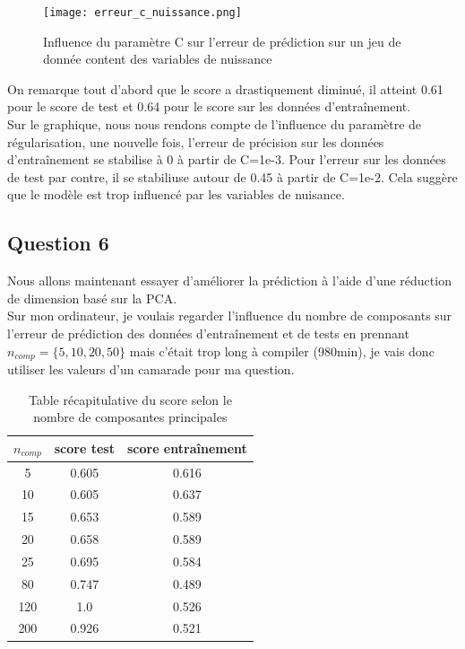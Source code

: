 \documentclass{article}
\begin{document}
\begin{figure}[H]
    \centering
    \texttt{[image: erreur\_c\_nuissance.png]}
    \caption{Influence du paramètre C sur l'erreur de prédiction sur un jeu de donnée content des variables de nuissance}
    \label{fig5}
\end{figure}

On remarque tout d'abord que le score a drastiquement diminué, il atteint 0.61 pour le score de test et 0.64 pour le score sur les données d'entraînement.\\
Sur le graphique, nous nous rendons compte de l'influence du paramètre de régularisation, une nouvelle fois, l'erreur de précision sur les données d'entraînement se stabilise à 0 à partir de C=1e-3. Pour l'erreur sur les données de test par contre, il se stabiliuse autour de 0.45 à partir de C=1e-2. Cela suggère que le modèle est trop influencé par les variables de nuisance.

\subsection{Question 6}
Nous allons maintenant essayer d'améliorer la prédiction à l'aide d'une réduction de dimension basé sur la PCA.\\

Sur mon ordinateur, je voulais regarder l'influence du nombre de composants sur l'erreur de prédiction des données d'entraînement et de tests en prennant $n_{comp}=\{5,10,20,50\}$ mais c'était trop long à compiler (980min), je vais donc utiliser les valeurs d'un camarade pour ma question.\\


\begin{table}[H]
    \centering
    \begin{tabular}{|c|c|c|}
    \hline
       $n_{comp}$  & score test & score entraînement \\
    \hline
       5  & 0.605 & 0.616  \\
    \hline     
      10   & 0.605  &  0.637 \\
    \hline     
       15  & 0.653 & 0.589  \\
    \hline     
      20   & 0.658 &   0.589 \\
    \hline
       25  & 0.695 &  0.584 \\
    \hline
       80  & 0.747 & 0.489  \\
    \hline
      120  & 1.0 &  0.526 \\
    \hline
      200  & 0.926 &  0.521 \\
    \hline
    \end{tabular}
    \caption{Table récapitulative du score selon le nombre de composantes principales}
    \label{tab1}
\end{table}
\end{document}
